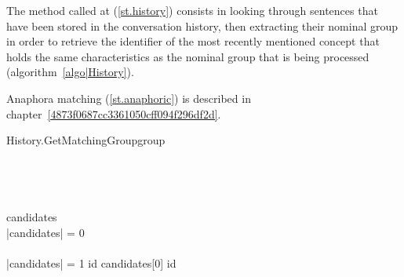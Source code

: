 \documentclass[twoside,a4paper,10pt]{report}
\begin{document}
The method called at (\ref{st.history}) consists in looking through sentences 
that have been stored in the conversation history, then extracting their nominal
group in order to retrieve the identifier of the most recently mentioned 
concept that holds the same characteristics as the nominal group that is being 
processed (algorithm~\ref{algo|History}).

Anaphora matching (\ref{st.anaphoric}) is described in
chapter~\ref{4873f0687cc3361050cff094f296df2d}.

\begin{pseudocode}[ruled]{History.GetMatchingGroup}{group}
\label{algo|History}
\\
 \GETS {}\\
 \\
 \\
	 \GETS {} \\ 
	
	candidates \GETS {} \cap {}\\
	\IF \left|{candidates}\right| = 0 \THEN
    \BEGIN
       \\
      \EXIT \\
    \END
   \ELSEIF \left|{candidates}\right| = 1 \THEN
      id \GETS candidates[0]
   \ELSE
   	  id \GETS {}\\
\ENDPROCEDURE
\end{pseudocode}
\end{document}
